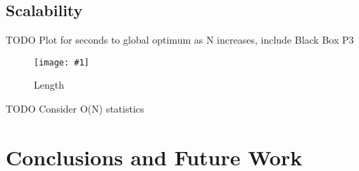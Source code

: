 \documentclass{sig-alternate}
\newcommand{\includegraphicsfit}[1]
{\texttt{[image: \#1]}}
\begin{document}
\subsection{Scalability}
TODO Plot for seconds to global optimum as N increases, include Black Box P3

\begin{figure}
  \centering
  \includegraphicsfit{length}
  \caption{Length}
  \label{fig-length}
\end{figure}

TODO Consider O(N) statistics

\section{Conclusions and Future Work}
%

%
%
\balancecolumns
\end{document}
